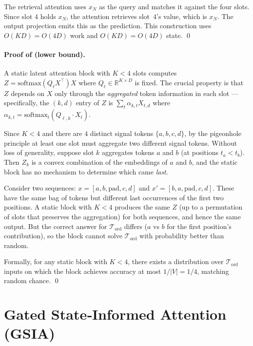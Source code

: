 \documentclass[10pt,twocolumn,letterpaper]{article}
\newcommand{\GSIA}{\textsc{GSIA}}
\begin{document}
The retrieval attention uses $x_N$ as the query and matches it against
the four slots.  Since slot $4$ holds $x_N$, the attention retrieves
slot~$4$'s value, which is $x_N$.  The output projection emits this as
the prediction.  This construction uses $O(KD)\!=\!O(4D)$ work and
$O(KD)\!=\!O(4D)$ state.  \qed

\paragraph{Proof of  (lower bound).}
A static latent attention block with $K\!<\!4$ slots computes
$Z = \mathrm{softmax}(Q_\ell X^\top) X$ where $Q_\ell\!\in\!\mathbb{R}^{K\times D}$
is fixed.  The crucial property is that $Z$ depends on $X$ only through
the \emph{aggregated} token information in each slot — specifically, the
$(k, d)$ entry of $Z$ is $\sum_t \alpha_{k,t} X_{t,d}$ where
$\alpha_{k,t}\!=\!\mathrm{softmax}_t(Q_{\ell,k}\!\cdot\!X_t)$.

Since $K\!<\!4$ and there are $4$ distinct signal tokens $\{a,b,c,d\}$, by
the pigeonhole principle at least one slot must aggregate two different
signal tokens.  Without loss of generality, suppose slot $k$ aggregates
tokens $a$ and $b$ (at positions $t_a\!<\!t_b$).  Then $Z_k$ is a convex
combination of the embeddings of $a$ and $b$, and the static block has
no mechanism to determine which came \emph{last}.

Consider two sequences: $x\!=\![a, b, \text{pad}, c, d]$ and
$x'\!=\![b, a, \text{pad}, c, d]$.  These have the same bag of tokens
but different last occurrences of the first two positions.  A static
block with $K\!<\!4$ produces the same $Z$ (up to a permutation of slots
that preserves the aggregation) for both sequences, and hence the same
output.  But the correct answer for $\mathcal{T}_{\mathrm{ord}}$ differs
($a$ vs $b$ for the first position's contribution), so the block cannot
solve $\mathcal{T}_{\mathrm{ord}}$ with probability better than random.

Formally, for any static block with $K\!<\!4$, there exists a
distribution over $\mathcal{T}_{\mathrm{ord}}$ inputs on which the block
achieves accuracy at most $1/|V|\!=\!1/4$, matching random chance.  \qed

\section{Gated State‑Informed Attention (\GSIA{})}
\label{app:gsia}
\end{document}
